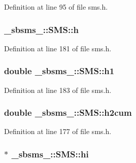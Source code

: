Definition at line 95 of file sms.\+h.

\subsubsection[{\texorpdfstring{h}{h}}]{ \+\_\+sbsms\+\_\+\+::\+S\+M\+S\+::h\hspace{0.3cm}{\ttfamily [protected]}}\hypertarget{class__sbsms___1_1_s_m_s_a1f651e7489c4cb796fa6d55fb8ca5c70}{}\label{class__sbsms___1_1_s_m_s_a1f651e7489c4cb796fa6d55fb8ca5c70}


Definition at line 181 of file sms.\+h.

\subsubsection[{\texorpdfstring{h1}{h1}}]{\setlength{\rightskip}{0pt plus 5cm}double \+\_\+sbsms\+\_\+\+::\+S\+M\+S\+::h1\hspace{0.3cm}{\ttfamily [protected]}}\hypertarget{class__sbsms___1_1_s_m_s_af2ef3438763a51310fe066b660db9627}{}\label{class__sbsms___1_1_s_m_s_af2ef3438763a51310fe066b660db9627}


Definition at line 183 of file sms.\+h.

\subsubsection[{\texorpdfstring{h2cum}{h2cum}}]{\setlength{\rightskip}{0pt plus 5cm}double \+\_\+sbsms\+\_\+\+::\+S\+M\+S\+::h2cum\hspace{0.3cm}{\ttfamily [protected]}}\hypertarget{class__sbsms___1_1_s_m_s_a2c13200d3b1b6e024e46c57307d53f48}{}\label{class__sbsms___1_1_s_m_s_a2c13200d3b1b6e024e46c57307d53f48}


Definition at line 177 of file sms.\+h.

\subsubsection[{\texorpdfstring{hi}{hi}}]{$\ast$ \+\_\+sbsms\+\_\+\+::\+S\+M\+S\+::hi\hspace{0.3cm}{\ttfamily [protected]}}\hypertarget{class__sbsms___1_1_s_m_s_ac814c6d294986bb11c5d281ca90ddf9a}{}\label{class__sbsms___1_1_s_m_s_ac814c6d294986bb11c5d281ca90ddf9a}



